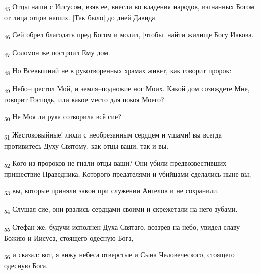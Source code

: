 \begin{tcolorbox}
\textsubscript{45} Отцы наши с Иисусом, взяв ее, внесли во владения народов, изгнанных Богом от лица отцов наших. [Так было] до дней Давида.
\end{tcolorbox}
\begin{tcolorbox}
\textsubscript{46} Сей обрел благодать пред Богом и молил, [чтобы] найти жилище Богу Иакова.
\end{tcolorbox}
\begin{tcolorbox}
\textsubscript{47} Соломон же построил Ему дом.
\end{tcolorbox}
\begin{tcolorbox}
\textsubscript{48} Но Всевышний не в рукотворенных храмах живет, как говорит пророк:
\end{tcolorbox}
\begin{tcolorbox}
\textsubscript{49} Небо--престол Мой, и земля--подножие ног Моих. Какой дом созиждете Мне, говорит Господь, или какое место для покоя Моего?
\end{tcolorbox}
\begin{tcolorbox}
\textsubscript{50} Не Моя ли рука сотворила всё сие?
\end{tcolorbox}
\begin{tcolorbox}
\textsubscript{51} Жестоковыйные! люди с необрезанным сердцем и ушами! вы всегда противитесь Духу Святому, как отцы ваши, так и вы.
\end{tcolorbox}
\begin{tcolorbox}
\textsubscript{52} Кого из пророков не гнали отцы ваши? Они убили предвозвестивших пришествие Праведника, Которого предателями и убийцами сделались ныне вы, --
\end{tcolorbox}
\begin{tcolorbox}
\textsubscript{53} вы, которые приняли закон при служении Ангелов и не сохранили.
\end{tcolorbox}
\begin{tcolorbox}
\textsubscript{54} Слушая сие, они рвались сердцами своими и скрежетали на него зубами.
\end{tcolorbox}
\begin{tcolorbox}
\textsubscript{55} Стефан же, будучи исполнен Духа Святаго, воззрев на небо, увидел славу Божию и Иисуса, стоящего одесную Бога,
\end{tcolorbox}
\begin{tcolorbox}
\textsubscript{56} и сказал: вот, я вижу небеса отверстые и Сына Человеческого, стоящего одесную Бога.
\end{tcolorbox}
